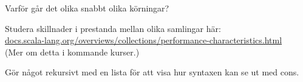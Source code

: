 \Subtask Varför går det olika snabbt olika körningar?

\Task Studera skillnader i prestanda mellan olika samlingar här: \\ \href{http://docs.scala-lang.org/overviews/collections/performance-characteristics.html}{docs.scala-lang.org/overviews/collections/performance-characteristics.html} \\
(Mer om detta i kommande kurser.)

\Task Gör något rekursivt med en lista för att visa hur syntaxen kan se ut med cons.
    